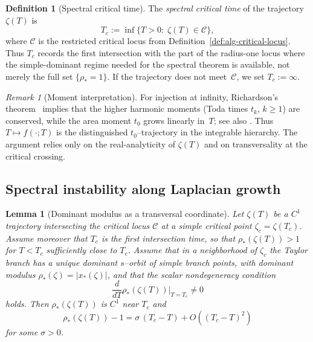 \documentclass[11pt]{amsart}
\numberwithin{equation}{section}
\theoremstyle{plain}
\newtheorem{lemma}[theorem]{Lemma}
\theoremstyle{definition}
\newtheorem{definition}[theorem]{Definition}
\theoremstyle{remark}
\newtheorem{remark}[theorem]{Remark}
\begin{document}
\begin{definition}[Spectral critical time]\label{def:Tc}
	The \emph{spectral critical time} of the trajectory $\zeta(T)$ is
	\begin{equation}\label{eq:Tc-def}
		T_c:=\inf\bigl\{T>0:\;\zeta(T)\in\mathcal C\bigr\},
	\end{equation}
	where $\mathcal C$ is the restricted critical locus
	from Definition~\ref{def:alg-critical-locus}. Thus $T_c$ records the first
	intersection with the part of the radius-one locus where the simple-dominant
	regime needed for the spectral theorem is available, not merely the full set
	$\{\rho_*=1\}$. If the trajectory does not meet~$\mathcal C$, we set
	$T_c:=\infty$.
\end{definition}

\begin{remark}[Moment interpretation]\label{rem:LG-moments}
	For injection at infinity, Richardson's theorem~\cite{Richardson1972}
	implies that the higher harmonic moments (Toda times $t_k$, $k\ge1$)
	are conserved, while the area moment $t_0$ grows linearly in~$T$; see
	also \cite{MineevWeinstein2000}.
	Thus $T\mapsto f(\cdot;T)$ is the distinguished $t_0$--trajectory
	in the integrable hierarchy. The argument relies only on the real-analyticity of $\zeta(T)$ and on transversality at the critical crossing.
\end{remark}


\subsection{Spectral instability along Laplacian growth}
\label{subsec:spectral-lg}

\begin{lemma}[Dominant modulus as a transversal coordinate]
	\label{lem:lg-transversal}
	Let $\zeta(T)$ be a $C^1$ trajectory intersecting the critical locus $\mathcal C$
	at a simple critical point $\zeta_c=\zeta(T_c)$. Assume moreover that $T_c$ is the first intersection time, so that $\rho_*(\zeta(T))>1$ for $T<T_c$ sufficiently close to $T_c$.
	Assume that in a neighborhood of $\zeta_c$ the Taylor branch has a unique dominant $s$--orbit of simple branch points,
	with dominant modulus $\rho_*(\zeta)=|x_*(\zeta)|$, and that the scalar nondegeneracy condition
	\[
		\frac{d}{dT}\rho_*(\zeta(T))\Big|_{T=T_c}\neq0
	\]
	holds.
	Then $\rho_*(\zeta(T))$ is $C^1$ near $T_c$ and
	\[
		\rho_*(\zeta(T))-1=\sigma\,(T_c-T)+O\!\left((T_c-T)^2\right)
	\]
	for some $\sigma>0$.
\end{lemma}
\end{document}
